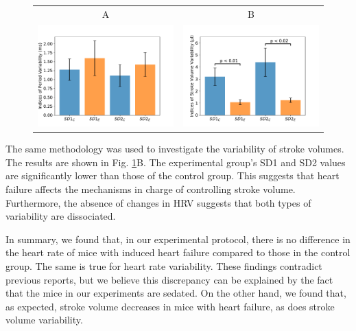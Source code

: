 \documentclass[%
preprint,
 amsmath,amssymb,
 aps,
]{revtex4-2}
\begin{document}
\begin{figure}[h!]
    \begin{tabular}{cc}
        A & B \\
        \includegraphics[width=3in]{Fig02_A.pdf} &
        \includegraphics[width=3in]{Fig02_B.pdf}
    \end{tabular}
    \caption{}
    \label{fig:fig02}
\end{figure}

The same methodology was used to investigate the variability of stroke volumes. The results are shown in Fig. \ref{fig:fig02}B. The experimental group's SD1 and SD2 values are significantly lower than those of the control group. This suggests that heart failure affects the mechanisms in charge of controlling stroke volume. Furthermore, the absence of changes in HRV suggests that both types of variability are dissociated.

In summary, we found that, in our experimental protocol, there is no difference in the heart rate of mice with induced heart failure compared to those in the control group. The same is true for heart rate variability. These findings contradict previous reports, but we believe this discrepancy can be explained by the fact that the mice in our experiments are sedated. On the other hand, we found that, as expected, stroke volume decreases in mice with heart failure, as does stroke volume variability. 
\end{document}
